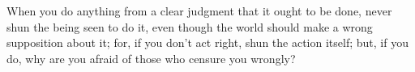 When you do anything from a clear judgment that it ought to be done, never shun
the being seen to do it, even  though the world should make a wrong supposition
about it; for, if you don't act right,  shun the action itself; but, if you do,
why are you afraid of those who censure you wrongly?
